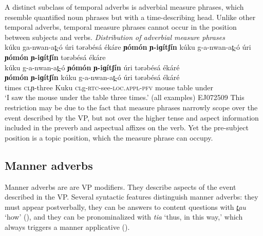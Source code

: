 A distinct subclass of temporal adverbs is adverbial measure phrases, which resemble quantified noun phrases but with a time-describing head. Unlike other temporal adverbs, temporal measure phrases cannot occur in the position between subjects and verbs.
\ea \textit{Distribution of adverbial measure phrases}\\
\ea	kúku ga-nwan-at̪-ó	úri	tərəbésá	ékáre	\textbf{ɲómón}	\textbf{ɲ-iɡítʃín}
\ex 	kúku g-a-nwan-at̪-ó	úri	\textbf{ɲómón}	\textbf{ɲ-iɡítʃín} tərəbésá	ékáre	\\
\ex 	kúku g-a-nwan-at̪-ó	\textbf{ɲómón}	\textbf{ɲ-iɡítʃín} úri	 tərəbésá	ékáré	\\
\ex \gll \textbf{ɲómón}	\textbf{ɲ-iɡítʃín}	kúku g-a-nwan-at̪-ó	 úri	 tərəbésá	ékáré	\\
	{times}		\textsc{cl}ɲ-{three} Kuku \textsc{cl}g-\textsc{rtc}-see-\textsc{loc.appl-pfv}	mouse	table	under \\
	\glt `I saw the mouse under the table three times.' (all examples) \hfill EJ072509
	\z
\z 	
This restriction may be due to the fact that measure phrases narrowly scope over the event described by the VP, but not over the higher tense and aspect information included in the preverb and aspectual affixes on the verb. Yet the pre-subject position is a topic position, which the measure phrase can occupy.

\subsection{Manner adverbs}\label{sec:ch13:manner}

Manner adverbs are are VP modifiers. They describe aspects of the event described in the VP. Several syntactic features distinguish manner adverbs: they must appear postverbally, they can be answers to content questions with \textit{t̪au} `how' (), and they can be pronominalized with \textit{tia} `thus, in this way,' which always triggers a manner applicative ().

